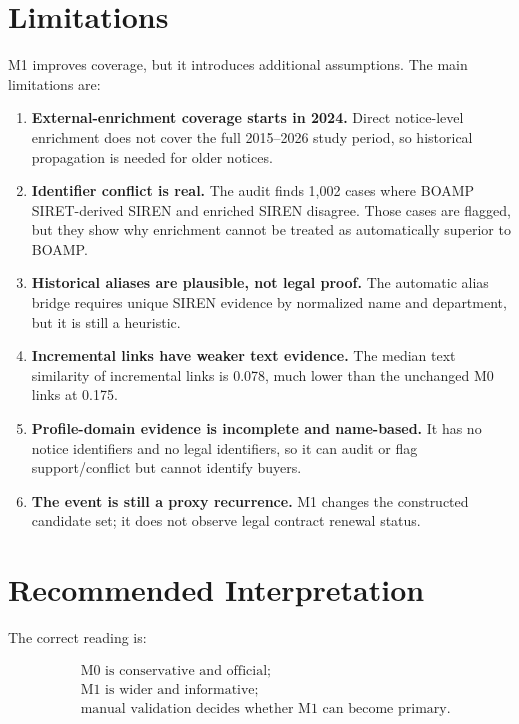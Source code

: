 \documentclass[11pt]{article}
\begin{document}
\section{Limitations}
\label{sec:limitations}

M1 improves coverage, but it introduces additional assumptions. The main
limitations are:

\begin{enumerate}
  \item \textbf{External-enrichment coverage starts in 2024.} Direct
        notice-level enrichment does not cover the full 2015--2026 study
        period, so historical propagation is needed for older notices.
  \item \textbf{Identifier conflict is real.} The audit finds 1,002 cases
        where BOAMP SIRET-derived SIREN and enriched SIREN disagree. Those
        cases are flagged, but they show why enrichment cannot be treated
        as automatically superior to BOAMP.
  \item \textbf{Historical aliases are plausible, not legal proof.} The
        automatic alias bridge requires unique SIREN evidence by normalized
        name and department, but it is still a heuristic.
  \item \textbf{Incremental links have weaker text evidence.} The median
        text similarity of incremental links is 0.078, much lower than the
        unchanged M0 links at 0.175.
  \item \textbf{Profile-domain evidence is incomplete and name-based.} It
        has no notice identifiers and no legal identifiers, so it can audit
        or flag support/conflict but cannot identify buyers.
  \item \textbf{The event is still a proxy recurrence.} M1 changes the
        constructed candidate set; it does not observe legal contract
        renewal status.
\end{enumerate}

\section{Recommended Interpretation}
\label{sec:interpretation}

The correct reading is:

\[
\begin{aligned}
&\text{M0 is conservative and official;}\\
&\text{M1 is wider and informative;}\\
&\text{manual validation decides whether M1 can become primary.}
\end{aligned}
\]
\end{document}
